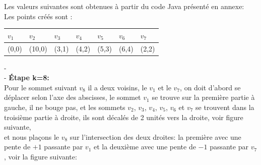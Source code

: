 \documentclass[hidelinks,letterpaper,12pt]{article}
\begin{document}
Les valeurs suivantes sont obtenues à partir du code Java présenté en annexe: \\
Les points créés sont :\\
\begin{tabularx}{\textwidth}{|*{7}{X|}}
\hline
$v_1$ & $v_2$ & $v_3$ & $v_4$ & $v_5$ & $v_6$ & $v_7$ \\
\hline
(0,0) & (10,0) & (3,1) & (4,2) & (5,3) & (6,4) & (2,2) \\
\hline
\end{tabularx}
{\color{white}-}
\\
{\color{white}-}
\textbf{Étape k=8:}
\\
Pour le sommet suivant $v_8$ il a deux voisins, le $v_1$ et le $v_7$, 
on doit d'abord se déplacer selon l'axe des abscisses, 
le sommet $v_1$ se trouve sur la première partie à gauche, il ne bouge pas, 
et les sommets $v_2$, $v_3$, $v_4$, $v_5$, $v_6$ et $v_7$ se trouvent dans la troisième partie à droite, ils sont décalés de 2 unités vers la droite, voir figure suivante, \\
et nous plaçons le $v_8$ sur l'intersection des deux droites: la première avec une pente de $+1$ passante par $v_1$ et la deuxième avec une pente de $-1$ passante par $v_7$, voir la figure suivante:
\end{document}
